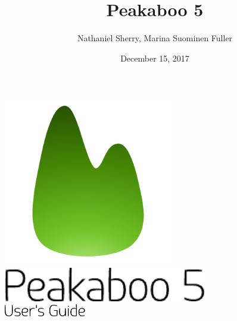 \documentclass[article,twoside,11pt]{report}
\title{Peakaboo 5}
\date{December 15, 2017}
\author{Nathaniel Sherry, Marina Suominen Fuller}
\begin{document}
\renewcommand{\headrulewidth}{0pt}
\lhead[]{}
\rhead[]{}


\pagestyle{empty}



\begin{titlepage}
	\vspace*{\fill}
	\centering
	\includegraphics[height=20em]{title/logo.pdf}\\
	\vspace*{1em}
	\includegraphics[height=4em]{title/peakaboo.pdf}\\
	\vspace*{1em}
	\includegraphics[height=1.5em]{title/usersguide.pdf}\\
	\vspace*{\fill}
	\vspace*{\fill}
\end{titlepage}

\cleardoublepage

\pagestyle{empty}
\setcounter{tocdepth}{1}
\tableofcontents
{}
\cleardoublepage
\setcounter{page}{1}
\pagestyle{fancyplain}
\end{document}
